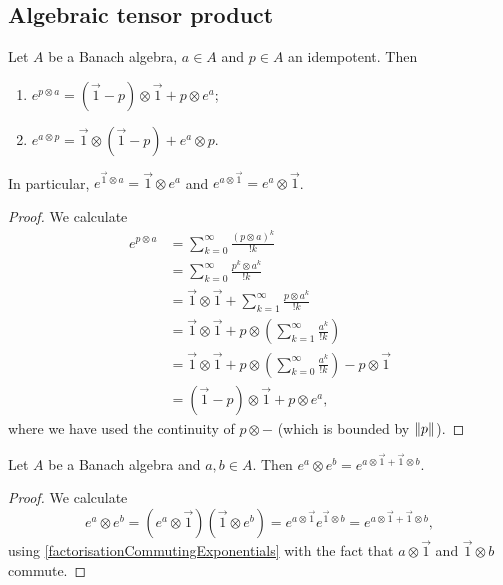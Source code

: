 \subsection{Algebraic tensor product}
\begin{proposition}
Let $A$ be a Banach algebra, $a\in A$ and $p\in A$ an idempotent. Then
\begin{enumerate}
\item $e^{p\otimes a} = (\vec{1}-p)\otimes \vec{1} + p\otimes e^a$;
\item $e^{a\otimes p} = \vec{1}\otimes (\vec{1}-p) + e^a\otimes p$.
\end{enumerate}
In particular, $e^{\vec{1}\otimes a} = \vec{1}\otimes e^a$ and $e^{a\otimes \vec{1}} = e^a\otimes \vec{1}$.
\end{proposition}
\begin{proof}
We calculate
\begin{align*}
e^{p\otimes a} &= \sum_{k=0}^\infty \frac{(p\otimes a)^k}{!k} \\
&= \sum_{k=0}^\infty \frac{p^k\otimes a^k}{!k} \\
&= \vec{1}\otimes \vec{1} + \sum_{k=1}^\infty \frac{p\otimes a^k}{!k} \\
&= \vec{1}\otimes \vec{1} + p\otimes\left(\sum_{k=1}^\infty \frac{a^k}{!k}\right) \\
&= \vec{1}\otimes \vec{1} + p\otimes\left(\sum_{k=0}^\infty \frac{a^k}{!k}\right) - p\otimes \vec{1} \\
&= (\vec{1} - p)\otimes \vec{1} + p\otimes e^a,
\end{align*}
where we have used the continuity of $p\otimes -$ (which is bounded by $\lVert p\rVert$).
\end{proof}
\begin{corollary}
Let $A$ be a Banach algebra and $a,b\in A$. Then $e^a\otimes e^b = e^{a\otimes \vec{1} + \vec{1}\otimes b}$.
\end{corollary}
\begin{proof}
We calculate
\[ e^a\otimes e^b = (e^a\otimes \vec{1})(\vec{1}\otimes e^b) = e^{a\otimes \vec{1}}e^{\vec{1}\otimes b} = e^{a\otimes \vec{1} + \vec{1}\otimes b}, \]
using \ref{factorisationCommutingExponentials} with the fact that $a\otimes \vec{1}$ and $\vec{1}\otimes b$ commute.
\end{proof}

